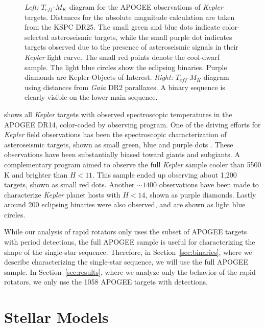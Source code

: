 \documentclass[manuscript]{aastex6}
\newcommand{\Kepler}{\mbox{\textit{Kepler}}}
\newcommand{\Gaia}{\mbox{\textit{Gaia}}}
\newcommand{\Teff}{\ensuremath{T_{eff}}}
\begin{document}
\begin{figure}[htb]
    \centering
    \caption{\emph{Left:} \Teff-\(M_K\) diagram for the APOGEE observations of
        \Kepler{} targets. Distances for the absolute magnitude calculation are
        taken from the KSPC DR25. The small green and blue dots indicate
        color-selected asteroseismic targets, while the small purple dot
        indicates targets observed due to the presence of asteroseismic signals
        in their \Kepler{} light curve. The small red points denote the
        cool-dwarf sample. The light blue circles show the eclipsing binaries.
        Purple diamonds are Kepler Objects of Interest. \emph{Right:} 
        \Teff-\(M_K\) diagram using distances from \Gaia{} DR2 parallaxes. A binary sequence is clearly
visible on the lower main sequence.}\label{fig:apogee_selection}
\end{figure}

 shows all \Kepler{} targets with observed
spectroscopic temperatures in the APOGEE DR14, color-coded by observing
program. One of the driving efforts for \Kepler{} field observations has been
the spectroscopic characterization of asteroseismic targets, shown as small
green, blue and purple dots \citep{Zasowski17,Pinsonneault18}. These
observations have been substantially biased toward giants and subgiants. A
complementary program aimed to observe the full \Kepler{} sample cooler than
5500 K and brighter than \(H < 11\). This sample ended up observing about 1,200
targets, shown as small red dots. Another \(\sim 1400\) observations have been
made to characterize \Kepler{} planet hosts with \(H < 14\), shown as purple
diamonds. Lastly around 200 eclipsing binaries \citep{Prsa11,Slawson11} were
also observed, and are shown as light blue circles.

While our analysis of rapid rotators only uses the subset of APOGEE targets
with period detections, the full APOGEE sample is useful for characterizing the
shape of the single-star sequence. Therefore, in Section~\ref{sec:binaries},
where we describe characterizing the single-star sequence, we will use the full
APOGEE sample. In Section~\ref{sec:results}, where we analyze only the behavior
of the rapid rotators, we only use the 1058 APOGEE targets with
\citet{McQuillan14} detections.

\section{Stellar Models}
\end{document}
